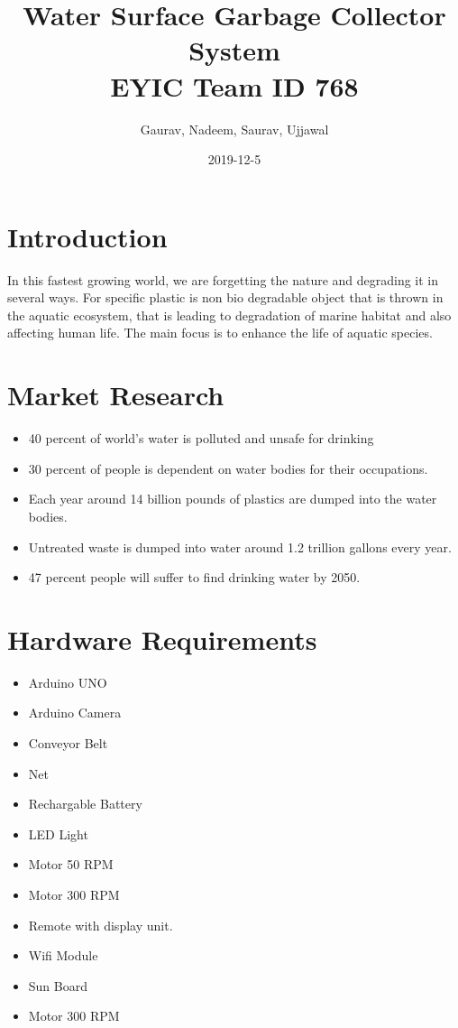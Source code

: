 \documentclass{article}
\title{ Water Surface Garbage Collector System 
\linebreak
\\
\large EYIC Team ID 768
}
\date{2019-12-5}
\author{Gaurav, Nadeem, Saurav, Ujjawal}
\begin{document}
\maketitle
{}

\newpage
\section{Introduction}
In this fastest growing world, we are forgetting the nature and degrading it in several ways. 
For specific plastic is non bio degradable object that is thrown in the aquatic ecosystem, that is leading to degradation of marine habitat and also affecting human life. The main focus is to enhance the life of aquatic species.
\linebreak
\linebreak

\section{Market Research}
\begin{itemize}
	\item 40 percent of world’s water is polluted and unsafe for drinking
	\item 30 percent of people is dependent on water bodies for their occupations.
	\item Each year around 14 billion pounds of plastics are dumped into the water bodies.
	\item Untreated waste is dumped into water around 1.2 trillion gallons every year.
	\item 47 percent people will suffer to find drinking water by 2050.
\linebreak
\linebreak
\end{itemize}


\section{Hardware Requirements}
\begin{itemize}
	\item Arduino UNO
	\item Arduino Camera
	\item Conveyor Belt
	\item Net
	\item Rechargable Battery
	\item LED Light
	\item Motor 50 RPM
	\item Motor 300 RPM
	\item Remote with display unit.
	\item Wifi Module
	\item Sun Board
	\item Motor 300 RPM
\newline
\newline
\end{itemize}
\end{document}
